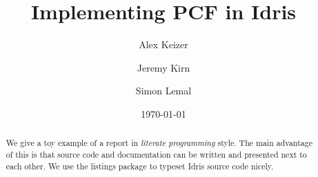 \documentclass[12pt,a4paper]{article}
\title{Implementing PCF in Idris}
\author{Alex Keizer \and Jeremy Kirn \and Simon Lemal}
\date{\today}
\begin{document}
\maketitle

\begin{abstract}
We give a toy example of a report in \emph{literate programming} style.
The main advantage of this is that source code and documentation can
be written and presented next to each other.
We use the listings package to typeset Idris source code nicely.
\end{abstract}

\vfill

\tableofcontents

\clearpage







\end{document}
